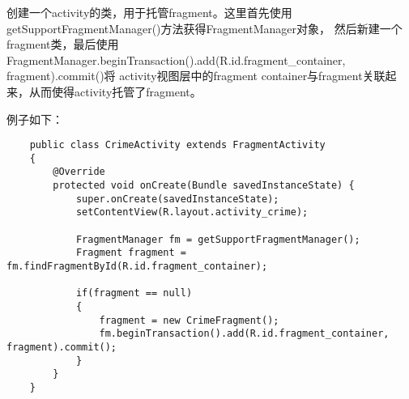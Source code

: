 \documentclass[a4paper,left=2.5cm,right=2.5cm,11pt]{article}
\begin{document}
	创建一个activity的类，用于托管fragment。这里首先使用getSupportFragmentManager()方法获得FragmentManager对象，
	然后新建一个fragment类，最后使用FragmentManager.beginTransaction().add(R.id.fragment\_container, fragment).commit()将
	activity视图层中的fragment container与fragment关联起来，从而使得activity托管了fragment。\par

	例子如下：
	\begin{lstlisting}
	public class CrimeActivity extends FragmentActivity 
	{
		@Override
		protected void onCreate(Bundle savedInstanceState) {
			super.onCreate(savedInstanceState);
			setContentView(R.layout.activity_crime);

			FragmentManager fm = getSupportFragmentManager();
			Fragment fragment = fm.findFragmentById(R.id.fragment_container);

			if(fragment == null)
			{
				fragment = new CrimeFragment();
				fm.beginTransaction().add(R.id.fragment_container, fragment).commit();
			}
		}
	}
	\end{lstlisting}
\end{document}
